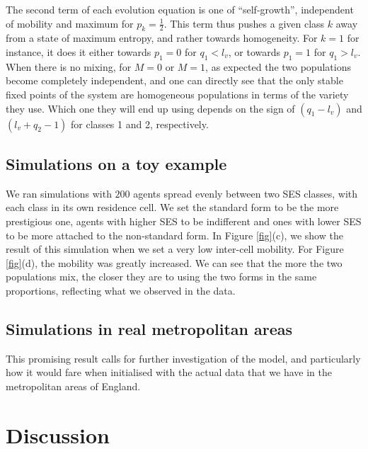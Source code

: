 \documentclass[../thesis.tex]{subfiles}
\begin{document}
The second term of each evolution equation is one of ``self-growth'', independent of
mobility and maximum for $p_k = \frac{1}{2}$. This term thus pushes a given class $k$
away from a state of maximum entropy, and rather towards homogeneity. For $k = 1$ for
instance, it does it either towards $p_1 = 0$ for $q_1 < l_v$, or towards $p_1 = 1$ for
$q_1 > l_v$. When there is no mixing, for $M = 0$ or $M = 1$, as expected the two
populations become completely independent, and one can directly see that the only stable
fixed points of the system are homogeneous populations in terms of the variety they use.
Which one they will end up using depends on the sign of $(q_1 - l_v)$ and $(l_v + q_2 -
1)$ for classes 1 and 2, respectively.


\subsection{Simulations on a toy example}
We ran simulations with $200$ agents spread evenly between two \ac{SES} classes, with each
class in its own residence cell. We set the standard form to be the more prestigious
one, agents with higher \ac{SES} to be indifferent and ones with lower \ac{SES} to be more
attached to the non-standard form. In Figure \cref{fig}(c), we show the result of this
simulation when we set a very low inter-cell mobility. For Figure \cref{fig}(d), the
mobility was greatly increased. We can see that the more the two populations mix, the
closer they are to using the two forms in the same proportions, reflecting what we
observed in the data.


\subsection{Simulations in real metropolitan areas}
This promising result calls for further investigation of the model, and particularly how
it would fare when initialised with the actual data that we have in the metropolitan
areas of England.


\section{Discussion}
\end{document}
